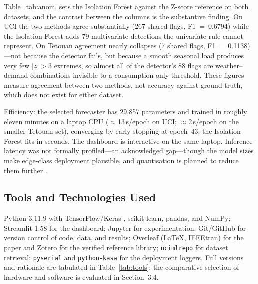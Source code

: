 \documentclass[11pt,a4paper]{article}
\begin{document}
Table~\ref{tab:anom} sets the Isolation Forest against the Z-score reference on both datasets, and the contrast between the columns is the substantive finding. On UCI the two methods agree substantially (267 shared flags, F1~=~0.6794) while the Isolation Forest adds 79 multivariate detections the univariate rule cannot represent. On Tetouan agreement nearly collapses (7 shared flags, F1~=~0.1138)---not because the detector fails, but because a smooth seasonal load produces very few $|z|>3$ extremes, so almost all of the detector's 88 flags are weather--demand combinations invisible to a consumption-only threshold. These figures measure agreement between two methods, not accuracy against ground truth, which does not exist for either dataset.

 Efficiency: the selected forecaster
has 29{,}857 parameters and trained in roughly eleven minutes on a laptop CPU
($\approx$13\,s/epoch on UCI; $\approx$2\,s/epoch on the smaller Tetouan set),
converging by early stopping at epoch~43; the Isolation Forest fits in seconds.
The dashboard is interactive on the same laptop. Inference latency was not
formally profiled---an acknowledged gap---though the model sizes make
edge-class deployment plausible, and quantisation is planned to reduce them
further \cite{warden2019tinyml}.

\subsection{Tools and Technologies Used}
Python 3.11.9 with TensorFlow/Keras \cite{abadi2016tensorflow}, scikit-learn,
pandas, and NumPy; Streamlit 1.58 for the dashboard; Jupyter for
experimentation; Git/GitHub for version control of code, data, and results;
Overleaf (\LaTeX, IEEEtran) for the paper and Zotero for the verified reference
library; \texttt{ucimlrepo} for dataset retrieval; \texttt{pyserial} and
\texttt{python-kasa} for the deployment loggers. Full versions and rationale are
tabulated in Table~\ref{tab:tools}; the comparative selection of hardware and software is
evaluated in Section~3.4.
\end{document}
